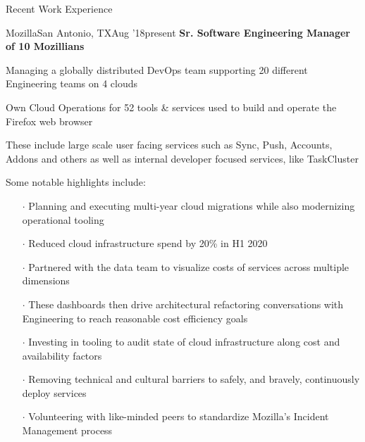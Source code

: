 \documentclass{resume} %
\begin{document}
\begin{rSection}{Recent Work Experience}


\begin{rSubsection}{Mozilla}{San Antonio, TX}{Aug '18}{present}
  {\textbf{Sr. Software Engineering Manager of 10 Mozillians}}

  \item Managing a globally distributed DevOps team supporting 20 different Engineering teams on 4 clouds
  \item Own Cloud Operations for 52 tools \& services used to build and operate the Firefox web browser
  \item These include large scale user facing services such as Sync, Push, Accounts, Addons and others as well as internal developer focused services, like TaskCluster 
  \item Some notable highlights include:
  \vspace{-0.5em}
  \begin{itemize}  \itemsep0.5pt \parskip0pt
    \item[$\cdot$] Planning and executing multi-year cloud migrations while also modernizing operational tooling
    \item[$\cdot$] Reduced cloud infrastructure spend by 20\% in H1 2020
    \item[$\cdot$] Partnered with the data team to visualize costs of services across multiple dimensions
    \item[$\cdot$] These dashboards then drive architectural refactoring conversations with Engineering to reach reasonable cost efficiency goals
    \item[$\cdot$] Investing in tooling to audit state of cloud infrastructure along cost and availability factors
    \item[$\cdot$] Removing technical and cultural barriers to safely, and bravely, continuously deploy services
    \item[$\cdot$] Volunteering with like-minded peers to standardize Mozilla's Incident Management process
  \end{itemize}
  
\end{rSubsection}



\end{rSection}
\end{document}

